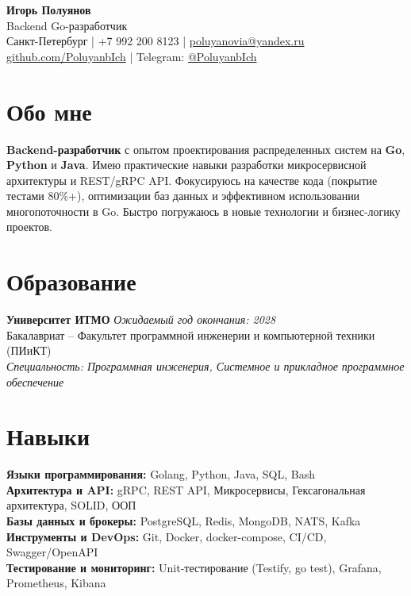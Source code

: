 \documentclass[11pt,a4paper]{article}
\begin{document}
\begin{center}
    {\Huge \textbf{Игорь Полуянов}} \\[0.3cm]
    {\huge Backend Go-разработчик} \\[0.3cm]
    Санкт-Петербург | +7 992 200 8123 | \href{mailto:poluyanovia@yandex.ru}{poluyanovia@yandex.ru} \\
    \href{https://github.com/PoluyanbIch}{github.com/PoluyanbIch} | Telegram: \href{https://t.me/PoluyanbIch}{@PoluyanbIch}
\end{center}

\section{Обо мне}
\textbf{Backend-разработчик} с опытом проектирования распределенных систем на \textbf{Go}, \textbf{Python} и \textbf{Java}. Имею практические навыки разработки микросервисной архитектуры и REST/gRPC API. Фокусируюсь на качестве кода (покрытие тестами 80\%+), оптимизации баз данных и эффективном использовании многопоточности в Go. Быстро погружаюсь в новые технологии и бизнес-логику проектов.

\section{Образование}
\textbf{Университет ИТМО} \hfill \textit{Ожидаемый год окончания: 2028} \\
Бакалавриат -- Факультет программной инженерии и компьютерной техники (ПИиКТ) \\
\textit{Специальность: Программная инженерия, Системное и прикладное программное обеспечение}

\section{Навыки}
\textbf{Языки программирования:} Golang, Python, Java, SQL, Bash \\
\textbf{Архитектура и API:} gRPC, REST API, Микросервисы, Гексагональная архитектура, SOLID, ООП \\
\textbf{Базы данных и брокеры:} PostgreSQL, Redis, MongoDB, NATS, Kafka \\
\textbf{Инструменты и DevOps:} Git, Docker, docker-compose, CI/CD, Swagger/OpenAPI \\
\textbf{Тестирование и мониторинг:} Unit-тестирование (Testify, go test), Grafana, Prometheus, Kibana
\end{document}
